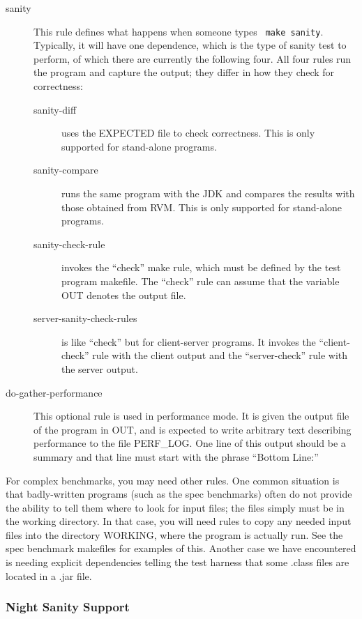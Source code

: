 \begin{description}
\begin{description}
\item[sanity] This rule defines what happens when someone types {\tt
make sanity}.  Typically, it will have one dependence, which is the type
of sanity test to perform, of which there are currently the following
four.  All four rules run the program and capture the output; they
differ in how they check for correctness:
\begin{description}
\item[sanity-diff] uses the EXPECTED file to check correctness.  This
is only supported for stand-alone programs.
\item[sanity-compare] runs the same program with the JDK and compares
the results with those obtained from RVM.  This is only supported for
stand-alone programs. 
\item[sanity-check-rule] invokes the ``check'' make rule, which must be
defined by the test program makefile.  The ``check'' rule can assume
that the variable OUT denotes the output file.
\item[server-sanity-check-rules] is like ``check'' but for
client-server programs.  It invokes the ``client-check'' rule with the
client output and the ``server-check'' rule with the server output.
\end{description}

\item[do-gather-performance]  This optional rule is used in
performance mode.  It is given the output file of the program in OUT,
and is expected to write arbitrary text describing performance to the
file PERF\_LOG.  One line of this output should be a summary and that
line must start with the phrase ``Bottom Line:''

\end{description}

 For complex benchmarks, you may need other rules.  One common
situation is that badly-written programs (such as the spec benchmarks)
often do not provide the ability to tell them where to look for input
files; the files simply must be in the working directory.  In that
case, you will need rules to copy any needed input files into the
directory WORKING, where the program is actually run.  See the spec
benchmark makefiles for examples of this.  Another case we have
encountered is needing explicit dependencies telling the test harness
that some .class files are located in a .jar file.

\end{description}

\subsubsection{Night Sanity Support}

